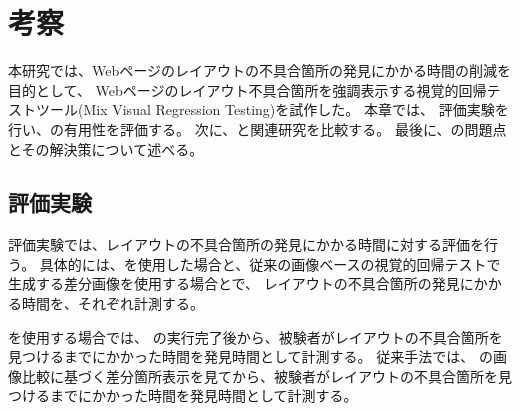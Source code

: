 \chapter{考察}\label{cha:discussion}
本研究では、Webページのレイアウトの不具合箇所の発見にかかる時間の削減を目的として、
Webページのレイアウト不具合箇所を強調表示する視覚的回帰テストツール\toolName(Mix Visual Regression Testing)を試作した。
本章では、
評価実験を行い、\toolName の有用性を評価する。
次に、\toolName と関連研究を比較する。
最後に、\toolName の問題点とその解決策について述べる。

\section{評価実験}
評価実験では、レイアウトの不具合箇所の発見にかかる時間に対する評価を行う。
具体的には、\toolName を使用した場合と、従来の画像ベースの視覚的回帰テストで生成する差分画像を使用する場合とで、
レイアウトの不具合箇所の発見にかかる時間を、それぞれ計測する。

\toolName を使用する場合では、
\toolName の実行完了後から、被験者がレイアウトの不具合箇所を見つけるまでにかかった時間を発見時間として計測する。
従来手法では、
\toolName の画像比較に基づく差分箇所表示を見てから、被験者がレイアウトの不具合箇所を見つけるまでにかかった時間を発見時間として計測する。

